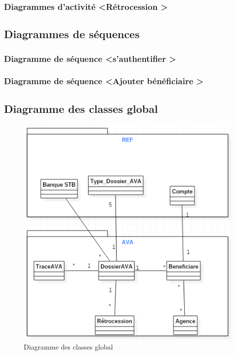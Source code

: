   \subsubsection{Diagrammes d'activité \textless Rétrocession \textgreater}
  
  \subsection{Diagrammes de séquences}
  
  \subsubsection{Diagramme de séquence \textless s'authentifier \textgreater}
  
  \subsubsection{Diagramme de séquence \textless Ajouter bénéficiaire \textgreater}
  
  \subsection{Diagramme des classes global}
  
\begin{figure}[!h]



\begin{center}
\includegraphics{./conception/diagramme_classes}

\caption{Diagramme des classes global}
\end{center}
\end{figure}
  
  
  
  
 

 
 
 

 